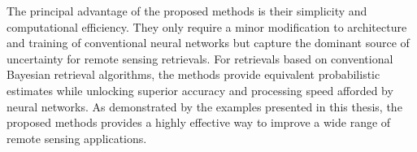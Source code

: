 The principal advantage of the proposed methods is their simplicity and
computational efficiency. They only require a minor modification to architecture
and training of conventional neural networks but capture the dominant source of
uncertainty for remote sensing retrievals. For retrievals based on conventional
Bayesian retrieval algorithms, the methods provide equivalent probabilistic
estimates while unlocking superior accuracy and processing speed afforded by
neural networks. As demonstrated by the examples presented in this thesis, the
proposed methods provides a highly effective way to improve a wide range of
remote sensing applications.




